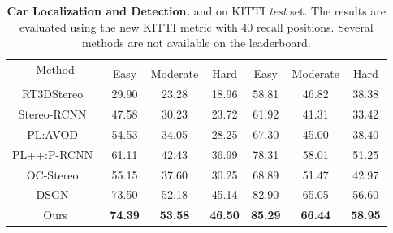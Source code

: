 \documentclass[letterpaper, 10 pt, conference]{ieeeconf}
\begin{document}
\begin{table*}
	\small
	\centering
	\begin{tabular}{|c||ccc||ccc|}
		\hline
		\multirow{2}{*}{Method} & \multicolumn{3}{c||}{} & \multicolumn{3}{c|}{} \\
		            &    Easy & Moderate &  Hard &  Easy & Moderate &  Hard \\ \hline
				RT3DStereo~\cite{konigshof2019realtime} & 29.90 &23.28 & 18.96 &58.81 & 46.82& 38.38
		\\ \hline
		Stereo-RCNN~\cite{li2019stereo} &   47.58 & 30.23 & 23.72 & 61.92 & 41.31 & 33.42 \\ \hline
		PL:AVOD~\cite{wang2019pseudo} & 54.53 & 34.05 & 28.25 & 67.30 & 45.00 & 38.40
		\\ \hline
		PL++:P-RCNN~\cite{you2019pseudo} & 61.11 & 42.43 & 36.99 & 78.31 & 58.01 & 51.25 \\ \hline
		OC-Stereo~\cite{pon2019object} &55.15 & 37.60 & 30.25 & 68.89 & 51.47 & 42.97 \\
		\hline
		DSGN~\cite{chen2020dsgn} &{73.50} & {52.18} & {45.14} & 82.90 & 65.05 & 56.60\\
		\hline
		Ours   & \textbf{74.39} & \textbf{53.58} & \textbf{46.50} & \textbf{85.29} & \textbf{66.44} & \textbf{58.95} \\ \hline
	\end{tabular}
	\caption{\textbf{Car Localization and Detection.} \emph{} and \emph{} on KITTI \emph{test} set. The results are evaluated using the new KITTI metric with 40 recall positions. Several methods are not available on the leaderboard. }
	\label{tab:kitti_test_cars}
\end{table*}
\end{document}
